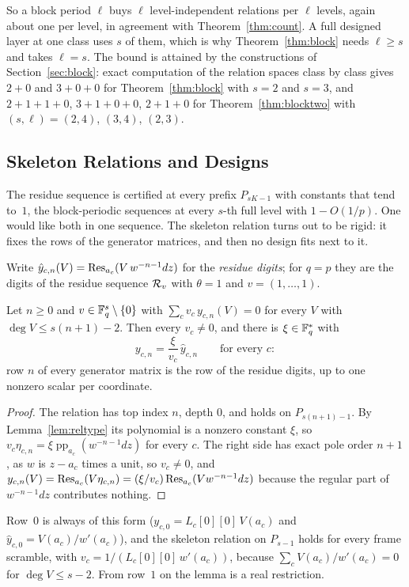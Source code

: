 So a block period $\ell$ buys $\ell$ level-independent relations per $\ell$ levels, again about one per level, in agreement with Theorem~\ref{thm:count}. A full designed layer at one class uses $s$ of them, which is why Theorem~\ref{thm:block} needs $\ell\ge s$ and takes $\ell=s$. The bound is attained by the constructions of Section~\ref{sec:block}: exact computation of the relation spaces class by class gives $2+0$ and $3+0+0$ for Theorem~\ref{thm:block} with $s=2$ and $s=3$, and $2+1+1+0$, $3+1+0+0$, $2+1+0$ for Theorem~\ref{thm:blocktwo} with $(s,\ell)=(2,4)$, $(3,4)$, $(2,3)$.

\subsection{Skeleton Relations and Designs}\label{sec:countskel}
The residue sequence is certified at every prefix $P_{sK-1}$ with constants that tend to~$1$, the block-periodic sequences at every $s$-th full level with $1-O(1/p)$. One would like both in one sequence. The skeleton relation turns out to be rigid: it fixes the rows of the generator matrices, and then no design fits next to it.

Write $\hat y_{c,n}(V)=\operatorname{Res}_{a_c}(V\,w^{-n-1}dz)$ for the \emph{residue digits}; for $q=p$ they are the digits of the residue sequence $\mathcal{R}_v$ with $\theta=1$ and $v=(1,\dots,1)$.

\begin{lemma}\label{lem:rigid}
Let $n\ge0$ and $v\in\mathbb{F}_q^s\setminus\{0\}$ with $\sum_cv_c\,y_{c,n}(V)=0$ for every $V$ with $\deg V\le s(n+1)-2$. Then every $v_c\ne0$, and there is $\xi\in\mathbb{F}_q^*$ with
\[
y_{c,n}=\frac{\xi}{v_c}\,\hat y_{c,n}\qquad\text{for every }c:
\]
row $n$ of every generator matrix is the row of the residue digits, up to one nonzero scalar per coordinate.
\end{lemma}

\begin{proof}
The relation has top index $n$, depth $0$, and holds on $P_{s(n+1)-1}$. By Lemma~\ref{lem:reltype} its polynomial is a nonzero constant $\xi$, so $v_c\eta_{c,n}=\xi\operatorname{pp}_{a_c}(w^{-n-1}dz)$ for every $c$. The right side has exact pole order $n+1$, as $w$ is $z-a_c$ times a unit, so $v_c\ne0$, and $y_{c,n}(V)=\operatorname{Res}_{a_c}(V\eta_{c,n})=(\xi/v_c)\operatorname{Res}_{a_c}(Vw^{-n-1}dz)$ because the regular part of $w^{-n-1}dz$ contributes nothing.
\end{proof}

Row~$0$ is always of this form ($y_{c,0}=L_c[0][0]\,V(a_c)$ and $\hat y_{c,0}=V(a_c)/w'(a_c)$), and the skeleton relation on $P_{s-1}$ holds for every frame scramble, with $v_c=1/(L_c[0][0]\,w'(a_c))$, because $\sum_cV(a_c)/w'(a_c)=0$ for $\deg V\le s-2$. From row~$1$ on the lemma is a real restriction.

